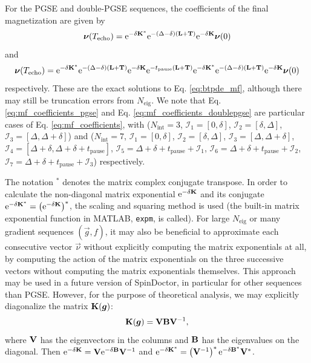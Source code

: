 \documentclass[a4paper]{article}
\begin{document}
For the PGSE and double-PGSE sequences, the coefficients of the final magnetization are given by
\begin{equation}\label{eq:mf_coefficients_pgse}
    \bm{\nu}(T_\text{echo}) = \mathrm{e}^{-\delta\mathbf{K}^*} \mathrm{e}^{-(\Delta - \delta)(\mathbf{L} + \mathbf{T})} \mathrm{e}^{-\delta \mathbf{K}} \bm{\nu}(0)
\end{equation}
and
\begin{equation}\label{eq:mf_coefficients_doublepgse}
    \bm{\nu}(T_\text{echo}) = \mathrm{e}^{-\delta \mathbf{K}^*} \mathrm{e}^{-(\Delta - \delta)(\mathbf{L} + \mathbf{T})} \mathrm{e}^{-\delta \mathbf{K}} \mathrm{e}^{-t_\text{pause}(\mathbf{L} + \mathbf{T})} \mathrm{e}^{-\delta \mathbf{K}^*} \mathrm{e}^{-(\Delta - \delta)(\mathbf{L} + \mathbf{T})} \mathrm{e}^{-\delta \mathbf{K}} \bm{\nu}(0)
\end{equation}
respectively. These are the exact solutions to Eq. \eqref{eq:btpde_mf}, although there may still be truncation errors from $N_\text{eig}$. We note that Eq. \eqref{eq:mf_coefficients_pgse} and Eq. \eqref{eq:mf_coefficients_doublepgse} are particular cases of Eq. \eqref{eq:mf_coefficients}, with ($N_\text{int} = 3$, $\mathcal{I}_1 = [0, \delta]$, $\mathcal{I}_2 = [\delta, \Delta]$, $\mathcal{I}_3 = [\Delta, \Delta + \delta]$) and ($N_\text{int} = 7$, $\mathcal{I}_1 = [0, \delta]$, $\mathcal{I}_2 = [\delta, \Delta]$, $\mathcal{I}_3 = [\Delta, \Delta + \delta]$, $\mathcal{I}_4 = [\Delta + \delta, \Delta + \delta + t_\text{pause}]$, $\mathcal{I}_5 = \Delta + \delta + t_\text{pause} + \mathcal{I}_1$, $\mathcal{I}_6 = \Delta + \delta + t_\text{pause} + \mathcal{I}_2$, $\mathcal{I}_7 = \Delta + \delta + t_\text{pause} + \mathcal{I}_3$) respectively.

The notation $^{*}$ denotes the matrix complex conjugate transpose. In order to calculate the non-diagonal matrix exponential $\mathrm{e}^{-\delta \mathbf{K}}$ and its conjugate $\mathrm{e}^{-\delta \mathbf{K}^*}=\left(\mathrm{e}^{-\delta \mathbf{K}}\right)^*$, the scaling and squaring method \cite{Higham2005,Mohy2009} is used (the built-in matrix exponential function in MATLAB, \verb+expm+, is called). For large $N_\text{eig}$ or many gradient sequences $(\vec{g}, f)$, it may also be beneficial to approximate each consecutive vector $\vec{\nu}$ without explicitly computing the matrix exponentials at all, by computing the action of the matrix exponentials on the three successive vectors without computing the matrix exponentials themselves\cite{Mohy2011}. This approach may be used in a future version of SpinDoctor, in particular for other sequences than PGSE. However, for the purpose of theoretical analysis, we may explicitly diagonalize the matrix $\mathbf{K}(\bm{g})$:
\begin{equation}\label{eq:bt_matrix}
    \mathbf{K}(\bm{g}) = \mathbf{V} \mathbf{B} \mathbf{V}^{-1},
\end{equation}
where $\mathbf{V}$ has the eigenvectors in the columns and $\mathbf{B}$ has the eigenvalues on the diagonal. Then $\mathrm{e}^{-\delta\mathbf{K}} = \mathbf{V} \mathrm{e}^{-\delta \mathbf{B}} \mathbf{V}^{-1}$ and $\mathrm{e}^{-\delta\mathbf{K}^*} = \left(\mathbf{V}^{-1}\right)^{*} \mathrm{e}^{-\delta \mathbf{B}^{*}} \mathbf{V}^{*}$.
\end{document}
